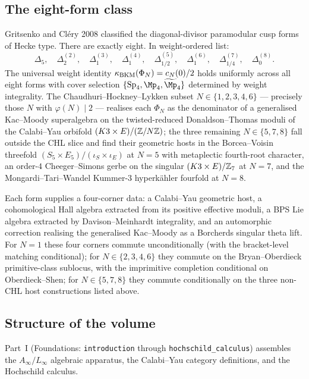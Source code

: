 \subsection{The eight-form class}
\label{wn:sec:platonic-intro-eight-form-wn}

Gritsenko and Cl\'ery 2008 classified the diagonal-divisor
paramodular cusp forms of Hecke type. There are exactly eight.
In weight-ordered list:
\[
\Delta_5, \quad \Delta_2^{(2)}, \quad \Delta_1^{(3)}, \quad
\Delta_1^{(4)}, \quad \Delta_{1/2}^{(5)}, \quad \Delta_1^{(6)},
\quad \Delta_{1/4}^{(7)}, \quad \Delta_0^{(8)}.
\]
The universal weight identity $\kappa_{\mathrm{BKM}}(\Phi_N) = c_N(0)/2$ holds
uniformly across all eight forms with cover selection
$\{\Sp_4, \Mp_4, \widetilde{\Mp}_4\}$ determined by weight
integrality. The Chaudhuri--Hockney--Lykken subset
$N \in \{1, 2, 3, 4, 6\}$ --- precisely those $N$ with
$\varphi(N) \mid 2$ --- realises each $\Phi_N$ as the denominator
of a generalised Kac--Moody superalgebra on the twisted-reduced
Donaldson--Thomas moduli of the Calabi--Yau orbifold
$(K3 \times E)/(\mathbb{Z}/N\mathbb{Z})$; the three remaining $N \in \{5, 7, 8\}$
fall outside the CHL slice and find their geometric hosts in
the Borcea--Voisin threefold $(S_5 \times E_5)/(\iota_S \times \iota_E)$
at $N = 5$ with metaplectic fourth-root character, an
order-$4$ Cheeger--Simons gerbe on the singular
$(K3 \times E)/\mathbb{Z}_7$ at $N = 7$, and the Mongardi--Tari--Wandel
Kummer-$3$ hyperk\"ahler fourfold at $N = 8$.

Each form supplies a four-corner data: a Calabi--Yau geometric host,
a cohomological Hall algebra extracted from its positive effective
moduli, a BPS Lie algebra extracted by Davison--Meinhardt
integrality, and an automorphic correction realising the
generalised Kac--Moody as a Borcherds singular theta lift.
For $N = 1$ these four corners commute unconditionally (with
the bracket-level matching conditional); for $N \in \{2, 3, 4, 6\}$
they commute on the Bryan--Oberdieck primitive-class sublocus,
with the imprimitive completion conditional on Oberdieck--Shen;
for $N \in \{5, 7, 8\}$ they commute conditionally on the three
non-CHL host constructions listed above.

\subsection{Structure of the volume}
\label{wn:sec:platonic-intro-structure-wn}

Part~I (Foundations: \texttt{introduction} through
\texttt{hochschild\_calculus}) assembles the
$A_\infty / L_\infty$ algebraic apparatus, the Calabi--Yau category
definitions, and the Hochschild calculus.

